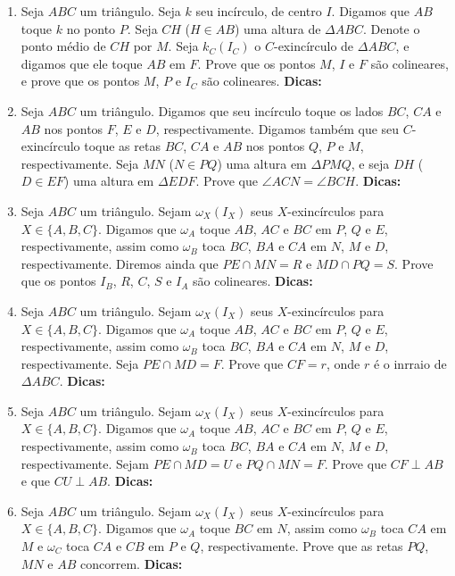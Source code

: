 \documentclass{article}
\newcommand{\dica}{\textbf{Dicas:}}
\newcommand{\iniTri}{Seja $ABC$ um triângulo}
\begin{document}
\begin{multicols}{2}
\begin{enumerate}
    \item \iniTri. Seja $k$ seu incírculo, de centro $I$. Digamos que $AB$ toque $k$ no ponto $P$. Seja $CH$ ($H\in AB$) uma altura de $\Delta ABC$. Denote o ponto médio de $CH$ por $M$. Seja $k_C(I_C)$ o $C$-exincírculo de $\Delta ABC$, e digamos que ele toque $AB$ em $F$. Prove que os pontos $M$, $I$ e $F$ são colineares, e prove que os pontos $M$, $P$ e $I_C$ são colineares. \dica %
    
    \item \iniTri. Digamos que seu incírculo toque os lados $BC$, $CA$ e $AB$ nos pontos $F$, $E$ e $D$, respectivamente. Digamos também que seu $C$-exincírculo toque as retas $BC$, $CA$ e $AB$ nos pontos $Q$, $P$ e $M$, respectivamente. Seja $MN$ ($N\in PQ$) uma altura em $\Delta PMQ$, e seja $DH$ ($D\in EF$) uma altura em $\Delta EDF$. Prove que $\angle ACN=\angle BCH$. \dica %
    
    \item \iniTri. Sejam $\omega_X(I_X)$ seus $X$-exincírculos para $X\in\{A,B,C\}$. Digamos que $\omega_A$ toque $AB$, $AC$ e $BC$ em $P$, $Q$ e $E$, respectivamente, assim como $\omega_B$ toca $BC$, $BA$ e $CA$ em $N$, $M$ e $D$, respectivamente. Diremos ainda que $PE\cap MN=R$ e $MD\cap PQ=S$. Prove que os pontos $I_B$, $R$, $C$, $S$ e $I_A$ são colineares. \dica %
    
    \item \iniTri. Sejam $\omega_X(I_X)$ seus $X$-exincírculos para $X\in\{A,B,C\}$. Digamos que $\omega_A$ toque $AB$, $AC$ e $BC$ em $P$, $Q$ e $E$, respectivamente, assim como $\omega_B$ toca $BC$, $BA$ e $CA$ em $N$, $M$ e $D$, respectivamente. Seja $PE\cap MD=F$. Prove que $CF=r$, onde $r$ é o inrraio de $\Delta ABC$. \dica %
    
    \item \iniTri. Sejam $\omega_X(I_X)$ seus $X$-exincírculos para $X\in\{A,B,C\}$. Digamos que $\omega_A$ toque $AB$, $AC$ e $BC$ em $P$, $Q$ e $E$, respectivamente, assim como $\omega_B$ toca $BC$, $BA$ e $CA$ em $N$, $M$ e $D$, respectivamente. Sejam $PE\cap MD=U$ e $PQ\cap MN=F$. Prove que $CF\perp AB$ e que $CU\perp AB$. \dica %
    
    \item \iniTri. Sejam $\omega_X(I_X)$ seus $X$-exincírculos para $X\in\{A,B,C\}$. Digamos que $\omega_A$ toque $BC$ em $N$, assim como $\omega_B$ toca $CA$ em $M$ e $\omega_C$ toca $CA$ e $CB$ em $P$ e $Q$, respectivamente. Prove que as retas $PQ$, $MN$ e $AB$ concorrem. \dica %
    

\end{enumerate}
\end{multicols}
\end{document}
